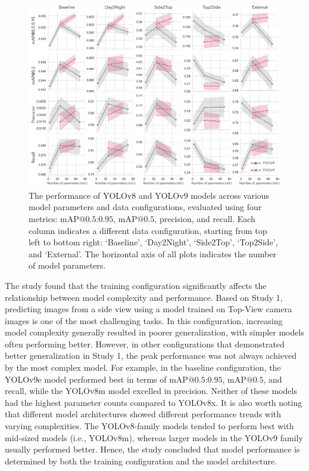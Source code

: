 \begin{figure}[h]
\centering
\includegraphics[width=1\textwidth]{figure_4.jpg}
\caption{The performance of YOLOv8 and YOLOv9 models across various model parameters and data configurations, evaluated using four metrics: $\text{mAP@{0.5:0.95}}$, $\text{mAP@{0.5}}$, precision, and recall. Each column indicates a different data configuration, starting from top left to bottom right: `Baseline', `Day2Night', `Side2Top', `Top2Side', and `External'. The horizontal axis of all plots indicates the number of model parameters.}
\label{fig:models}
\end{figure}

The study found that the training configuration significantly affects the relationship between model complexity and performance. Based on Study 1, predicting images from a side view using a model trained on Top-View camera images is one of the most challenging tasks. In this configuration, increasing model complexity generally resulted in poorer generalization, with simpler models often performing better. However, in other configurations that demonstrated better generalization in Study 1, the peak performance was not always achieved by the most complex model. For example, in the baseline configuration, the YOLOv9e model performed best in terms of $\text{mAP@{0.5:0.95}}$, $\text{mAP@{0.5}}$, and recall, while the YOLOv8m model excelled in precision. Neither of these models had the highest parameter counts compared to YOLOv8x. It is also worth noting that different model architectures showed different performance trends with varying complexities. The YOLOv8-family models tended to perform best with mid-sized models (i.e., YOLOv8m), whereas larger models in the YOLOv9 family usually performed better. Hence, the study concluded that model performance is determined by both the training configuration and the model architecture.

